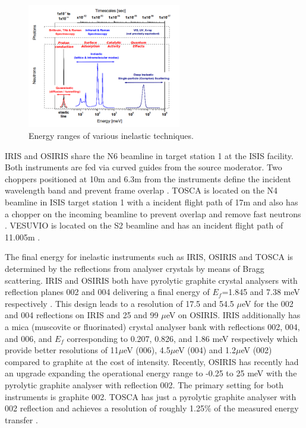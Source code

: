 \documentclass[paper=a4, fontsize=11pt]{scrartcl}	%
\numberwithin{equation}{section}															%
\numberwithin{figure}{section}																%
\numberwithin{table}{section}																%
\begin{document}
\begin{figure}[H]
\centering
\includegraphics[width=0.6\textwidth]{img/instrument-energy-chart.png}
\caption{Energy ranges of various inelastic techniques.}
\label{fig:instrument-energy-range}
\end{figure}


IRIS and OSIRIS share the N6 beamline in target station 1 at the ISIS facility. Both instruments are fed via curved guides from the source moderator. Two choppers positioned at 10m and 6.3m from the instruments define the incident wavelength band and prevent frame overlap \cite{smukhopadhyay2014}. TOSCA is located on the N4 beamline in ISIS target station 1 with a incident flight path of 17m and also has a chopper on the incoming beamline to prevent overlap and remove fast neutrons \cite{colognesi2002tosca}. VESUVIO is located on the S2 beamline and has an incident flight path of 11.005m \cite{mayers2011calibration}.

The final energy for inelastic instruments such as IRIS, OSIRIS and TOSCA is determined by the reflections from analyser crystals by means of Bragg scattering. IRIS and OSIRIS both have pyrolytic graphite crystal analysers with reflection planes 002 and 004 delivering a final energy of $E_f$=1.845 and 7.38 meV respectively \cite{adams2001iris}\cite{telling2008osiris}. This design leads to a resolution of 17.5 and 54.5 $\mu$eV for the 002 and 004 reflections on IRIS and 25 and 99 $\mu$eV on OSIRIS. IRIS additionally has a mica (muscovite or fluorinated) crystal analyser bank with reflections 002, 004, and 006, and $E_f$ corresponding to 0.207, 0.826, and 1.86 meV respectively which provide better resolutions of 11$\mu$eV (006), 4.5$\mu$eV (004) and
1.2$\mu$eV (002) compared to graphite at the cost of intensity. Recently, OSIRIS has recently had an upgrade expanding the operational energy range to -0.25 to 25 meV with the pyrolytic graphite analyser with reflection 002. The primary setting for both instruments is graphite 002. TOSCA has just a pyrolytic graphite analyser with 002 reflection \cite{colognesi2002tosca} and achieves a resolution of roughly 1.25\% of the measured energy transfer \cite{parker2003tosca}.
\end{document}

